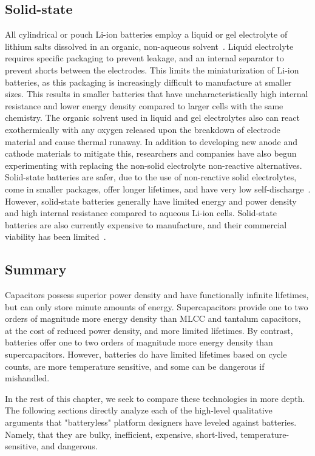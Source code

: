 \subsection{Solid-state}
All cylindrical or pouch Li-ion batteries employ a liquid or gel electrolyte of lithium salts dissolved in an organic, non-aqueous solvent~\cite{doughty2012general}. Liquid electrolyte requires specific packaging to prevent leakage, and an internal separator to prevent shorts between the electrodes. This limits the miniaturization of Li-ion batteries, as this packaging is increasingly difficult to manufacture at smaller sizes. This results in smaller batteries that have uncharacteristically high internal resistance and lower energy density compared to larger cells with the same chemistry.
The organic solvent used in liquid and gel electrolytes also can react exothermically with any oxygen released upon the breakdown of electrode material and cause thermal runaway. In addition to developing new anode and cathode materials to mitigate this, researchers and companies have also begun experimenting with replacing the non-solid electrolyte non-reactive alternatives. Solid-state batteries are safer, due to the use of non-reactive solid electrolytes, come in smaller packages, offer longer lifetimes, and have very low self-discharge~\cite{kim2015review}. However, solid-state batteries generally have limited energy and power density and high internal resistance compared to aqueous Li-ion cells. Solid-state batteries are also currently expensive to manufacture, and their commercial viability has been limited~\cite{kim2015review}.

\subsection{Summary}
Capacitors possess superior power density and have functionally infinite lifetimes, but can only store minute amounts of energy. Supercapacitors provide one to two orders of magnitude more energy density than MLCC and tantalum capacitors, at the cost of reduced power density, and more limited lifetimes. By contrast, batteries offer one to two orders of magnitude more energy density than supercapacitors. However, batteries do have limited lifetimes based on cycle counts, are more temperature sensitive, and some can be dangerous if mishandled. 

In the rest of this chapter, we seek to compare these technologies in more depth. The following sections directly analyze each of the high-level qualitative arguments that "batteryless" platform designers have leveled against batteries. Namely, that they are bulky, inefficient, expensive, short-lived, temperature-sensitive, and dangerous. 


